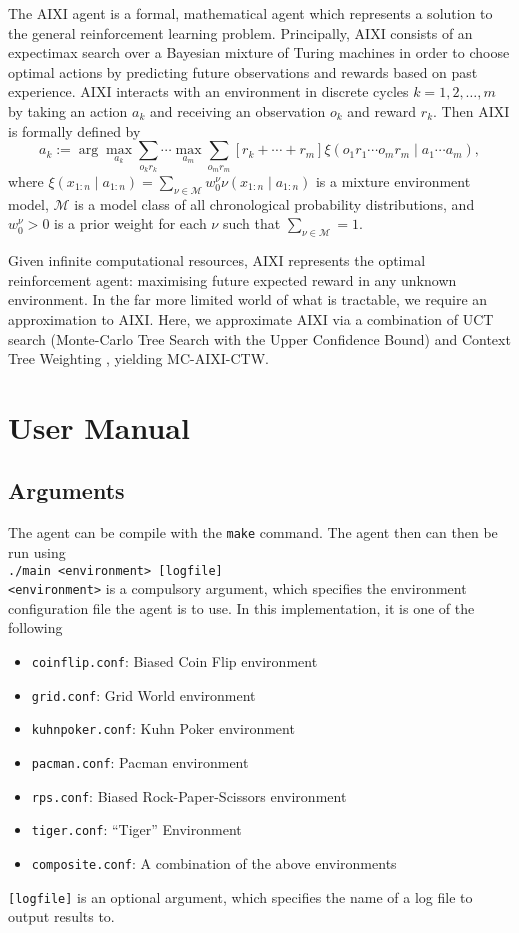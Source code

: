 \documentclass[pdftex,twoside,a4paper]{report}
\begin{document}
The AIXI agent is a formal, mathematical agent which represents a solution to
the general reinforcement learning problem. Principally, AIXI consists of an
expectimax search over a Bayesian mixture of Turing machines in order to
choose optimal actions by predicting future observations and rewards based on
past experience. AIXI interacts with an environment in discrete cycles $k = 1,
2, \dotsc, m$ by taking an action $a_k$ and receiving an
observation $o_k$ and reward $r_k$. Then AIXI is formally defined by
\[
  a_k := \arg\max_{a_k}\sum_{o_k r_k} \dotsb \max_{a_m} \sum_{o_m r_m} [r_k +
  \dotsb + r_m] \xi(o_1r_1 \dotsb o_mr_m \mid a_1 \dotsb a_m),
\]
where $\xi(x_{1:n} \mid a_{1:n}) = \sum_{\nu\in\mathcal{M}} w_0^\nu
\nu(x_{1:n} \mid a_{1:n})$ is a mixture environment model, $\mathcal{M}$ is a
model class of all chronological probability distributions, and $w_0^\nu > 0$
is a prior weight for each $\nu$ such that $\sum_{\nu\in\mathcal{M}} = 1$.

Given infinite computational resources, AIXI represents the optimal
reinforcement agent: maximising future expected reward in any unknown
environment.  In the far more limited world of what is tractable, we require
an approximation to AIXI. Here, we approximate AIXI via a combination of UCT
search (Monte-Carlo Tree Search with the Upper Confidence Bound)
\citep{kocsis2006bandit} and Context Tree Weighting
\citep{willems1995context}, yielding MC-AIXI-CTW.

\chapter{User Manual}
\section{Arguments}
The agent can be compile with the \texttt{make} command. The agent then can then be run using\\

\texttt{./main <environment> [logfile]}\\

\texttt{<environment>} is a compulsory argument, which specifies the environment configuration file the agent is to use. In this implementation, it is one of the following
\begin{itemize}
\item \texttt{coinflip.conf}: Biased Coin Flip environment
\item \texttt{grid.conf}: Grid World environment
\item \texttt{kuhnpoker.conf}: Kuhn Poker environment
\item \texttt{pacman.conf}: Pacman environment
\item \texttt{rps.conf}: Biased Rock-Paper-Scissors environment
\item \texttt{tiger.conf}: ``Tiger'' Environment
\item \texttt{composite.conf}: A combination of the above environments
\end{itemize}
\texttt{[logfile]} is an optional argument, which specifies the name of a log file to output results to.
\end{document}
